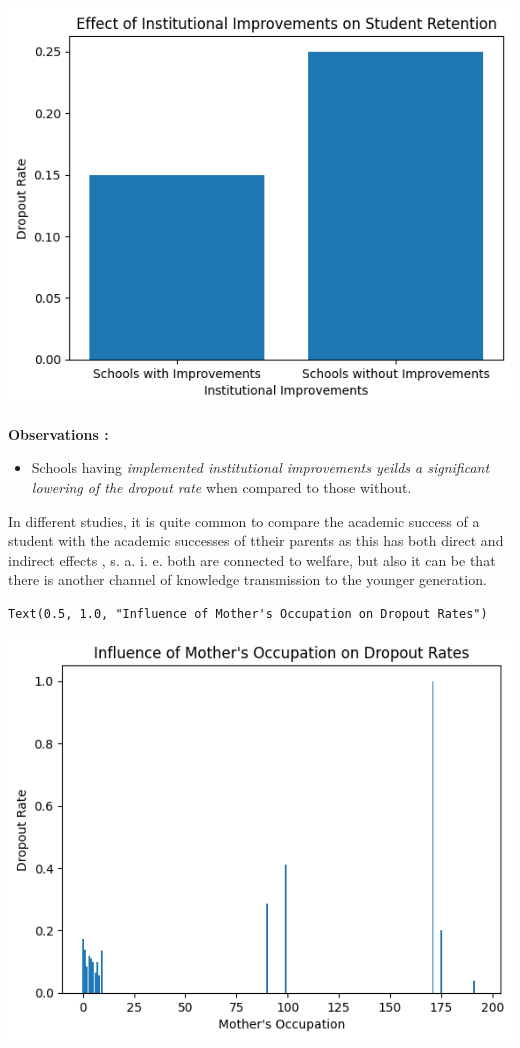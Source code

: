 \documentclass[
  letterpaper,
  DIV=11,
  numbers=noendperiod]{scrartcl}
\providecommand{\tightlist}{%
  \setlength{\itemsep}{0pt}\setlength{\parskip}{0pt}}\usepackage{longtable,booktabs,array}
\begin{document}
\includegraphics{report_AzadhdhinNedalYunisAlFraijat_files/figure-pdf/cell-12-output-2.png}

\textbf{Observations :}

\begin{itemize}
\tightlist
\item
  Schools having \emph{implemented institutional improvements yeilds a
  significant lowering of the dropout rate} when compared to those
  without.
\end{itemize}

In different studies, it is quite common to compare the academic success
of a student with the academic successes of ttheir parents as this has
both direct and indirect effects , s. a. i. e. both are connected to
welfare, but also it can be that there is another channel of knowledge
transmission to the younger generation.

\begin{verbatim}
Text(0.5, 1.0, "Influence of Mother's Occupation on Dropout Rates")
\end{verbatim}

\includegraphics{report_AzadhdhinNedalYunisAlFraijat_files/figure-pdf/cell-13-output-2.png}
\end{document}
